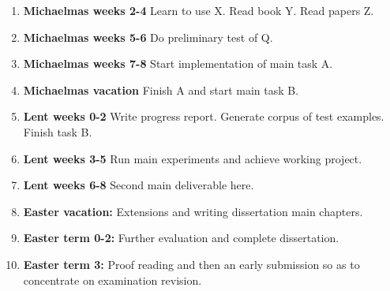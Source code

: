 \documentclass[12pt,a4]{article}
\begin{document}
\begin{enumerate}

\item {\bf Michaelmas weeks 2-4} Learn to use X. Read book Y. Read papers Z.

\item {\bf Michaelmas weeks 5-6} Do preliminary test of Q.

\item {\bf Michaelmas weeks 7-8} Start implementation of main task A.

\item {\bf Michaelmas vacation} Finish A and start main task B.

\item {\bf Lent weeks 0-2} Write progress report. Generate corpus of test examples. Finish task B.  

\item {\bf Lent weeks 3-5} Run main experiments and achieve working project.

\item {\bf Lent weeks 6-8} Second main deliverable here.

\item {\bf Easter vacation:} Extensions and writing dissertation main chapters.

\item {\bf Easter term 0-2:}  Further evaluation and complete dissertation.

\item {\bf Easter term 3:} Proof reading and then an early submission so as to concentrate on examination revision.

\end{enumerate}





\end{document}
